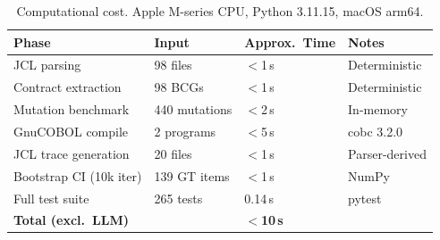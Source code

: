 \begin{table}[t]
\small
\centering
\caption{Computational cost. Apple M-series CPU, Python 3.11.15, macOS arm64.}
\label{table:cost}
\begin{tabular}{llll}
\toprule
Phase & Input & Approx.\ Time & Notes \\
\midrule
JCL parsing & 98 files & $<$1\,s & Deterministic \\
Contract extraction & 98 BCGs & $<$1\,s & Deterministic \\
Mutation benchmark & 440 mutations & $<$2\,s & In-memory \\
GnuCOBOL compile & 2 programs & $<$5\,s & cobc 3.2.0 \\
JCL trace generation & 20 files & $<$1\,s & Parser-derived \\
Bootstrap CI (10k iter) & 139 GT items & $<$1\,s & NumPy \\
Full test suite & 265 tests & 0.14\,s & pytest \\
\midrule
\textbf{Total (excl.\ LLM)} & & \textbf{$<$10\,s} & \\
\bottomrule
\end{tabular}
\end{table}
